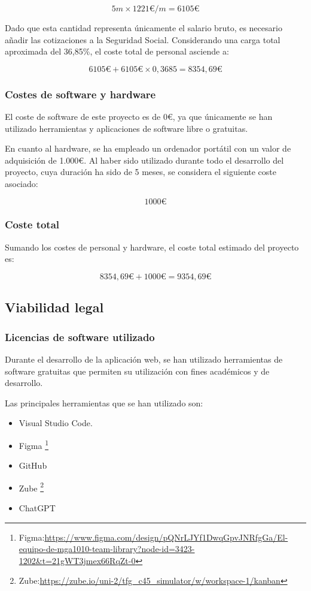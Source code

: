 \[
5m \times 1221\text{€}/m = 6105\text{€}
\]

Dado que esta cantidad representa únicamente el salario bruto, es necesario añadir las cotizaciones a la Seguridad Social. Considerando una carga total aproximada del 36,85\%, el coste total de personal asciende a:

\[
6105\text{€} + 6105\text{€} \times 0,3685 = 8354,69\text{€}
\]

\subsubsection{Costes de software y hardware}
\label{software_hardware_costs}

El coste de software de este proyecto es de 0€, ya que únicamente se han utilizado herramientas y aplicaciones de software libre o gratuitas.

En cuanto al hardware, se ha empleado un ordenador portátil con un valor de adquisición de 1.000€. Al haber sido utilizado durante todo el desarrollo del proyecto, cuya duración ha sido de 5 meses, se considera el siguiente coste asociado:

\[
1000\text{€}
\]

\subsubsection{Coste total}

Sumando los costes de personal y hardware, el coste total estimado del proyecto es:

\[
8354,69\text{€} + 1000\text{€} = 9354,69\text{€}
\]

\subsection{Viabilidad legal}

\subsubsection{Licencias de software utilizado}

Durante el desarrollo de la aplicación web, se han utilizado herramientas de software gratuitas que permiten su utilización con fines académicos y de desarrollo.

Las principales herramientas que se han utilizado son:

\begin{itemize}
    \item Visual Studio Code.
    \item Figma \footnote{Figma:\url{https://www.figma.com/design/pQNrLJYf1DwqGpvJNRfgGa/El-equipo-de-mga1010-team-library?node-id=3423-1202&t=21gWT3jmex66RqZt-0}}
    \item GitHub
    \item Zube \footnote{Zube:\url{https://zube.io/uni-2/tfg_c45_simulator/w/workspace-1/kanban}}
    \item ChatGPT
\end{itemize}

